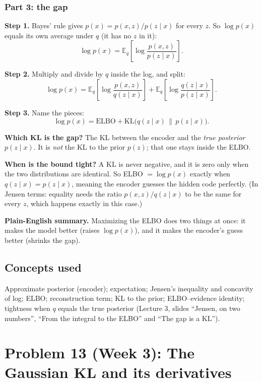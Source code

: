 \documentclass[12pt,a4paper]{article}
\begin{document}
\subsubsection{Part 3: the gap}

\textbf{Step 1.} Bayes' rule gives $p(x) = p(x, z)/p(z \mid x)$ for every $z$. So $\log p(x)$ equals its own average under $q$ (it has no $z$ in it):
\[
\log p(x) = \mathbb{E}_q\!\left[\log \frac{p(x, z)}{p(z \mid x)}\right].
\]

\textbf{Step 2.} Multiply and divide by $q$ inside the log, and split:
\[
\log p(x) = \mathbb{E}_q\!\left[\log \frac{p(x, z)}{q(z \mid x)}\right] + \mathbb{E}_q\!\left[\log \frac{q(z \mid x)}{p(z \mid x)}\right].
\]

\textbf{Step 3.} Name the pieces:
\[
\log p(x) = \text{ELBO} + \mathrm{KL}\big(q(z \mid x)\,\|\,p(z \mid x)\big).
\]

\textbf{Which KL is the gap?} The KL between the encoder and the \emph{true posterior} $p(z \mid x)$. It is \emph{not} the KL to the prior $p(z)$; that one stays inside the ELBO.

\textbf{When is the bound tight?} A KL is never negative, and it is zero only when the two distributions are identical. So ELBO $= \log p(x)$ exactly when $q(z \mid x) = p(z \mid x)$, meaning the encoder guesses the hidden code perfectly. (In Jensen terms: equality needs the ratio $p(x,z)/q(z\mid x)$ to be the same for every $z$, which happens exactly in this case.)

\textbf{Plain-English summary.} Maximizing the ELBO does two things at once: it makes the model better (raises $\log p(x)$), and it makes the encoder's guess better (shrinks the gap).

\subsection{Concepts used}

Approximate posterior (encoder); expectation; Jensen's inequality and concavity of log; ELBO; reconstruction term; KL to the prior; ELBO--evidence identity; tightness when $q$ equals the true posterior (Lecture 3, slides ``Jensen, on two numbers'', ``From the integral to the ELBO'' and ``The gap is a KL'').

\section{Problem 13 (Week 3): The Gaussian KL and its derivatives}
\end{document}
